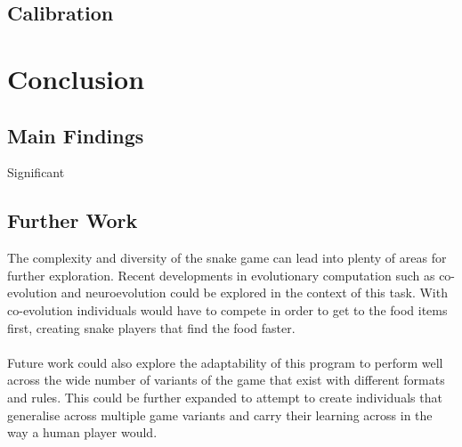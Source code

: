 \documentclass{article}
\begin{document}





\subsection{Calibration}

\section{Conclusion} %
\subsection{Main Findings}
Significant 



\subsection{Further Work}
The complexity and diversity of the snake game can lead into plenty of areas for further exploration. Recent developments in evolutionary computation such as co-evolution and neuroevolution could be explored in the context of this task. With co-evolution individuals would have to compete in order to get to the food items first, creating snake players that find the food faster.
\\\\
Future work could also explore the adaptability of this program to perform well across the wide number of variants of the game that exist with different formats and rules. This could be further expanded to attempt to create individuals that generalise across multiple game variants and carry their learning across in the way a human player would.
\end{document}
